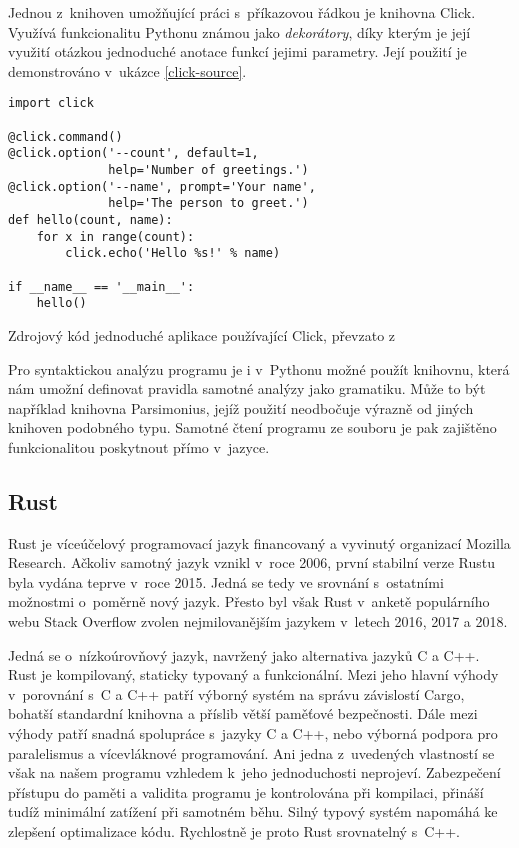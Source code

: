 Jednou z~knihoven umožňující práci s~příkazovou řádkou je knihovna Click\cite{website-click}. Využívá funkcionalitu Pythonu známou jako \textit{dekorátory}, díky kterým je její využití otázkou jednoduché anotace funkcí jejimi parametry. Její použití je demonstrováno v~ukázce \ref{click-source}.

\begin{listing}
\begin{verbatim}
import click

@click.command()
@click.option('--count', default=1,
              help='Number of greetings.')
@click.option('--name', prompt='Your name',
              help='The person to greet.')
def hello(count, name):
    for x in range(count):
        click.echo('Hello %s!' % name)

if __name__ == '__main__':
    hello()
\end{verbatim}
\caption{Zdrojový kód jednoduché aplikace používající Click, převzato z~\cite{website-click}}
\label{fig:click-source}
\end{listing}

Pro syntaktickou analýzu programu je i v~Pythonu možné použít knihovnu, která nám umožní definovat pravidla samotné analýzy jako gramatiku. Může to být například knihovna Parsimonius\cite{github-parsimonious}, jejíž použití neodbočuje výrazně od jiných knihoven podobného typu. Samotné čtení programu ze souboru je pak zajištěno funkcionalitou poskytnout přímo v~jazyce.

\subsection{Rust}
\label{assembler:rust}

Rust je víceúčelový programovací jazyk financovaný a vyvinutý organizací Mozilla Research\cite{rust-faq}. Ačkoliv samotný jazyk vznikl v~roce 2006\cite{rust-faq}, první stabilní verze Rustu byla vydána teprve v~roce 2015\cite{rust-faq}. Jedná se tedy ve srovnání s~ostatními možnostmi o~poměrně nový jazyk. Přesto byl však Rust v~anketě populárního webu Stack Overflow zvolen nejmilovanějším jazykem v~letech 2016\cite{so-survey-2016}, 2017\cite{so-survey-2017} a 2018\cite{so-survey-2018}.

Jedná se o~nízkoúrovňový jazyk, navržený jako alternativa jazyků C a C++. Rust je kompilovaný, staticky typovaný a funkcionální\cite{rust-faq}. Mezi jeho hlavní výhody v~porovnání s~C a C++ patří výborný systém na správu závislostí Cargo, bohatší standardní knihovna a příslib větší paměťové bezpečnosti. Dále mezi výhody patří snadná spolupráce s~jazyky C a C++, nebo výborná podpora pro paralelismus a vícevláknové programování. Ani jedna z~uvedených vlastností se však na našem programu vzhledem k~jeho jednoduchosti neprojeví. Zabezpečení přístupu do paměti a validita programu je kontrolována při kompilaci\cite{rust-faq}, přináší tudíž minimální zatížení při samotném běhu. Silný typový systém napomáhá ke zlepšení optimalizace kódu. Rychlostně je proto Rust srovnatelný s~C++\cite{rust-vs-cpp}.

